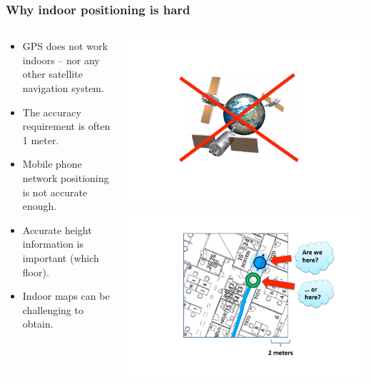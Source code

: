 \documentclass[xcolor=svgnames,english,handout]{beamer}
\begin{document}
\begin{frame}
  \frametitle{Why indoor positioning is hard}

  \begin{columns}
  \begin{column}{0.7\textwidth}
  \begin{itemize}[<+->]       
  \item \alert{GPS does not work indoors} -- nor any other satellite navigation system.
  \item The \alert{accuracy requirement} is often \alert{1 meter}.
  \item \alert{Mobile phone network} positioning is not accurate enough.
  \item Accurate \alert{height} information is important (which floor).
  \item \alert{Indoor maps} can be challenging to obtain.
  \end{itemize}
  \end{column}
  \begin{column}{0.3\textwidth}
  \includegraphics[width=\columnwidth]{nogps} \\
  \includegraphics[width=\columnwidth]{accuracy} \\

\end{column}
\end{columns}
\end{frame}
\end{document}
